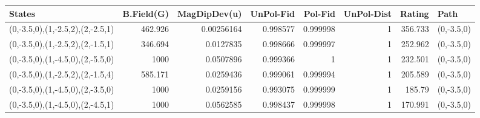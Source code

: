 \begin{tabular}{lrrrrrrl}
\hline
 States                           &   B.Field(G) &   MagDipDev(u) &   UnPol-Fid &   Pol-Fid &   UnPol-Dist &   Rating & Path       \\
\hline
 (0,-3.5,0),(1,-2.5,2),(2,-2.5,1) &      462.926 &     0.00256164 &    0.998577 &  0.999998 &            1 &  356.733 & (0,-3.5,0) \\
 (0,-3.5,0),(1,-2.5,2),(2,-1.5,1) &      346.694 &     0.0127835  &    0.998666 &  0.999997 &            1 &  252.962 & (0,-3.5,0) \\
 (0,-3.5,0),(1,-4.5,0),(2,-5.5,0) &     1000     &     0.0507896  &    0.999366 &  1        &            1 &  232.501 & (0,-3.5,0) \\
 (0,-3.5,0),(1,-2.5,2),(2,-1.5,4) &      585.171 &     0.0259436  &    0.999061 &  0.999994 &            1 &  205.589 & (0,-3.5,0) \\
 (0,-3.5,0),(1,-4.5,0),(2,-3.5,0) &     1000     &     0.0259156  &    0.993075 &  0.999999 &            1 &  185.79  & (0,-3.5,0) \\
 (0,-3.5,0),(1,-4.5,0),(2,-4.5,1) &     1000     &     0.0562585  &    0.998437 &  0.999998 &            1 &  170.991 & (0,-3.5,0) \\
\hline
\end{tabular}